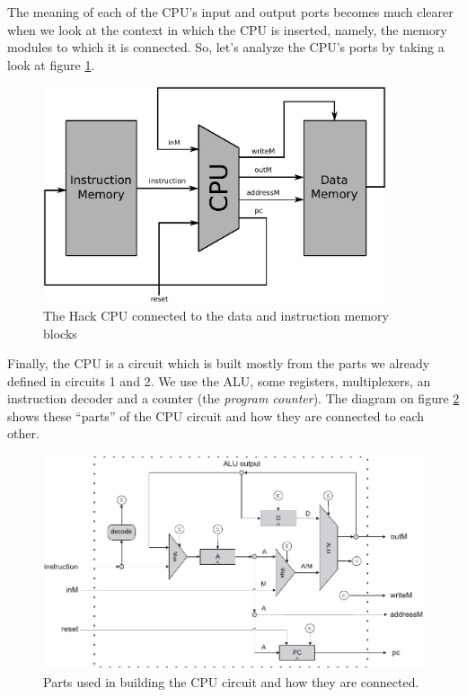 \documentclass[a4paper]{article}
\begin{document}
            The meaning of each of the CPU's input and output ports becomes much clearer when we
            look at the context in which the CPU is inserted, namely, the memory modules to which it
            is connected. So, let's analyze the CPU's ports by taking a look at figure
            \ref{fig:cpu-memory}.
            \begin{figure}[h!]
                \begin{center}
                    \includegraphics[width=0.9\textwidth]{imgs/cpu-memory.pdf}
                \end{center}
                \caption{The Hack CPU connected to the data and instruction memory blocks
                    \label{fig:cpu-memory}}
            \end{figure}

            Finally, the CPU is a circuit which is built mostly from the parts we already defined in
            circuits 1 and 2. We use the ALU, some registers, multiplexers, an instruction decoder
            and a counter (the \emph{program counter}). The diagram on figure \ref{fig:cpu-parts}
            shows these ``parts'' of the CPU circuit and how they are connected to each other.
            \begin{figure}[h!]
                \begin{center}
                    \includegraphics[width=1.0\textwidth]{imgs/cpu-parts.pdf}
                \end{center}
                \caption{Parts used in building the CPU circuit and how they are connected.
                    \label{fig:cpu-parts}}
            \end{figure}
\end{document}
